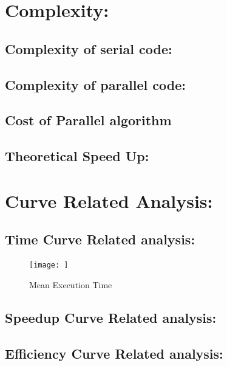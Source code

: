\documentclass[a4paper, 11pt]{article}
\begin{document}
\section*{Complexity:}
\subsection*{Complexity of serial code:}
\subsection*{Complexity of parallel code:}
\subsection*{Cost of Parallel algorithm}
\subsection*{Theoretical Speed Up:}
\paragraph{} 


\section*{Curve Related Analysis:}
\subsection*{Time Curve Related analysis:}
\paragraph{}
\begin{figure}[h!]
    \centering
    \texttt{[image: ]}
    \caption{Mean Execution Time}
    \label{fig 1:}
\end{figure}
\subsection*{Speedup Curve Related analysis:}
\subsection*{Efficiency Curve Related analysis:}


$$$$
\end{document}
